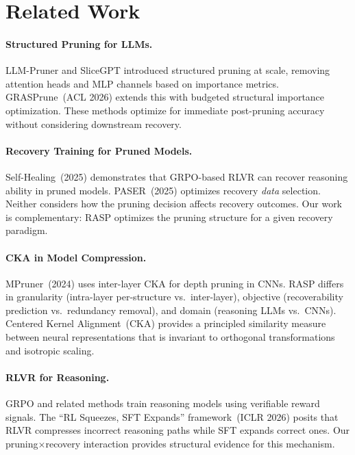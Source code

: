 \documentclass[11pt]{article}
\begin{document}
\section{Related Work}
\label{sec:related}

\paragraph{Structured Pruning for LLMs.}
LLM-Pruner and SliceGPT introduced structured pruning at scale, removing attention heads and MLP channels based on importance metrics. GRASPrune~(ACL 2026) extends this with budgeted structural importance optimization. These methods optimize for immediate post-pruning accuracy without considering downstream recovery.

\paragraph{Recovery Training for Pruned Models.}
Self-Healing~(2025) demonstrates that GRPO-based RLVR can recover reasoning ability in pruned models. PASER~(2025) optimizes recovery \emph{data} selection. Neither considers how the pruning decision affects recovery outcomes. Our work is complementary: RASP optimizes the pruning structure for a given recovery paradigm.

\paragraph{CKA in Model Compression.}
MPruner~(2024) uses inter-layer CKA for depth pruning in CNNs. RASP differs in granularity (intra-layer per-structure vs.\ inter-layer), objective (recoverability prediction vs.\ redundancy removal), and domain (reasoning LLMs vs.\ CNNs). Centered Kernel Alignment~(CKA) provides a principled similarity measure between neural representations that is invariant to orthogonal transformations and isotropic scaling.

\paragraph{RLVR for Reasoning.}
GRPO and related methods train reasoning models using verifiable reward signals. The ``RL Squeezes, SFT Expands'' framework~(ICLR 2026) posits that RLVR compresses incorrect reasoning paths while SFT expands correct ones. Our pruning$\times$recovery interaction provides structural evidence for this mechanism.
\end{document}
